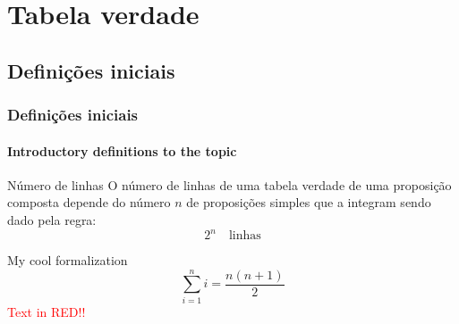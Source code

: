 \section{Tabela verdade}
%
\subsection{Definições iniciais}
%
\begin{frame}[c]
    \frametitle{Definições iniciais}
    \framesubtitle{Introductory definitions to the topic}
    \begin{block}{Número de linhas}
        O número de linhas de uma tabela verdade de uma proposição composta depende do número $n$ de proposições simples que a integram sendo dado pela regra: \\[2pt]
        \begin{equation}
            2^n \quad \text{linhas}
        \end{equation}
    \end{block}
    \begin{tcolorbox}[colback=red!5,colframe=red!75!black,title=My title]
        My cool formalization
        \tcblower
        \begin{equation}
            \displaystyle\sum\limits_{i=1}^n i = \frac{n(n+1)}{2}    
        \end{equation}
        \textcolor{red}{Text in RED!!}
    \end{tcolorbox}
\end{frame}
%
